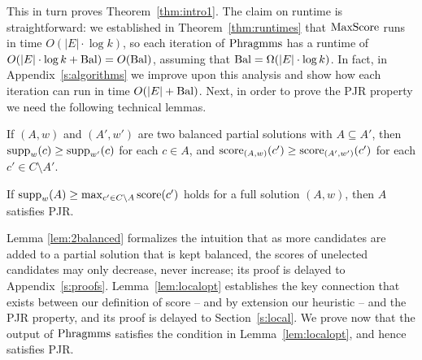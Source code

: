 This in turn proves Theorem~\ref{thm:intro1}. 
The claim on runtime is straightforward: we established in Theorem~\ref{thm:runtimes} that $\operatorname{MaxScore}$ runs in time $O(|E|\cdot \log k)$, so each iteration of $\operatorname{Phragmms}$ has a runtime of $O(|E|\cdot \log k + \operatorname{Bal})=O(\operatorname{Bal})$, assuming that $\operatorname{Bal}= \Omega(|E|\cdot \log k)$. 
In fact, in Appendix~\ref{s:algorithms} we improve upon this analysis and show how each iteration can run in time $O(|E| + \operatorname{Bal})$.
Next, in order to prove the PJR property we need the following technical lemmas.

\begin{lemma}\label{lem:2balanced}
If $(A,w)$ and $(A',w')$ are two balanced partial solutions with $A\subseteq A'$, then $\operatorname{supp}_w(c) \geq \operatorname{supp}_{w'}(c)$ for each $c\in A$, and $\operatorname{score}_{(A,w)}(c')\geq \operatorname{score}_{(A',w')}(c')$ for each $c'\in C\setminus A'$.
\end{lemma}

\begin{lemma}\label{lem:localopt}
If $\operatorname{supp}_w(A)\geq \max_{c'\in C\setminus A} \operatorname{score}(c')$ holds for a full solution $(A,w)$, then $A$ satisfies PJR.
\end{lemma}

Lemma \ref{lem:2balanced} formalizes the intuition that as more candidates are added to a partial solution that is kept balanced, the scores of unelected candidates may only decrease, never increase; its proof is delayed to Appendix~\ref{s:proofs}.
Lemma~\ref{lem:localopt} establishes the key connection that exists between our definition of score -- and by extension our heuristic -- and the PJR property, and its proof is delayed to Section~\ref{s:local}. 
We prove now that the output of $\operatorname{Phragmms}$ satisfies the condition in Lemma~\ref{lem:localopt}, and hence satisfies PJR.

